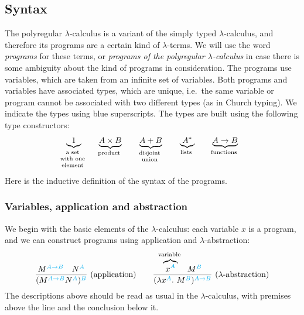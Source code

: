 \documentclass[a4paper,UKenglish,cleveref, autoref, thm-restate]{lipics-v2021}
\newcommand{\myunderbrace}[2]{\underbrace{#1}_{\mathclap{\text{\scriptsize 
\begin{tabular}{c}
	#2
\end{tabular} }}}}
\newcommand{\myoverbrace}[2]{\overbrace{#1}^{\mathclap{\text{\scriptsize 
\begin{tabular}{c}
	#2
\end{tabular} }}}}
\begin{document}
\subsection{Syntax} The polyregular $\lambda$-calculus is a variant of the simply typed $\lambda$-calculus, and therefore its programs are a certain kind of $\lambda$-terms. We will use the word \emph{programs} for these terms, or \emph{programs of the polyregular $\lambda$-calculus} in case there is some ambiguity about the kind of programs in consideration.   The programs use variables, which are taken from an infinite set of variables. Both programs and variables have associated types, which are unique, i.e.~the same variable or  program cannot be associated with two different types (as in Church typing). We indicate the types using blue superscripts. The types  are built using the following type constructors: 
\begin{align*}
    \myunderbrace{1}{a set \\ with one \\ element}
    \qquad 
    \myunderbrace{A \times B}{product} \qquad 
    \myunderbrace{A + B}{disjoint\\ union} \qquad 
    \myunderbrace{A^*}{lists} \qquad 
    \myunderbrace{A \to B}{functions}
\end{align*}
Here is the inductive definition of the syntax  of the programs.

\newcommand{\lambdarule}[3]{\frac{#1}{#2}\text{\ (#3)}}


\subsubsection{Variables, application and abstraction} \label{item:language-variables}  We begin with the basic elements of the $\lambda$-calculus: each variable $x$ is a program, and we  can construct programs using application and $\lambda$-abstraction:
    \begin{align*}
    \lambdarule{\church M {A \to B} \quad \church N  A}{\church{(\church M {A \to B} \church N  A)}  B}{application}
    \qquad 
    \lambdarule{\myoverbrace{\church x  A}{variable}\quad  \church M  B}{\church {(\lambda \church x  A.\ \church M  B)} {A \to B}}{$\lambda$-abstraction}
    \end{align*}
    The descriptions above should be read as usual in the $\lambda$-calculus, with premises  above the line and the conclusion below it. 
 
\end{document}
